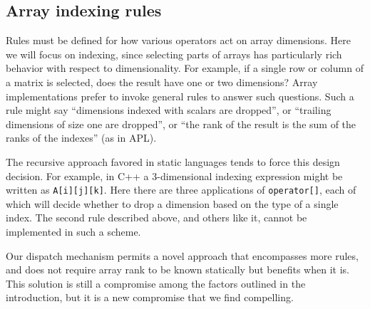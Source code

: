 \documentclass[preprint]{sigplanconf}
\newcommand{\code}[1]{\texttt{#1}}
\begin{document}


\subsection{Array indexing rules}

Rules must be defined for how various operators act
on array dimensions. Here we will focus on indexing, since selecting parts of
arrays has particularly rich behavior with respect to dimensionality. For
example, if a single row or column of a matrix is selected, does the result
have one or two dimensions? Array implementations prefer to invoke general
rules to answer such questions. Such a rule might say ``dimensions indexed
with scalars are dropped'', or ``trailing dimensions of size one are
dropped'', or ``the rank of the result is the sum of the ranks of the
indexes'' (as in APL).

The recursive approach favored in static languages tends to force this
design decision. For example, in C++ a 3-dimensional indexing
expression might be written as \code{A[i][j][k]}. Here there are three
applications of \code{operator[]}, each of which will decide whether to
drop a dimension based on the type of a single index. The second rule
described above, and others like it, cannot be implemented in such a
scheme.

Our dispatch mechanism permits a novel approach that encompasses more
rules, and does not require array rank to be known statically but
benefits when it is.
This solution is still a compromise among the factors outlined in
the introduction, but it is a new compromise that we find compelling.
\end{document}
